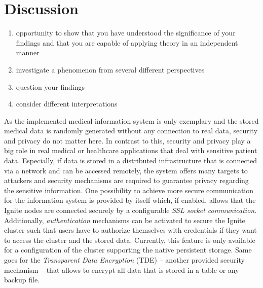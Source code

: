 
\section{Discussion}
\label{sec:disc}

\begin{enumerate}
    \item opportunity to show that you have understood the significance of your findings and that you are capable of applying theory in an independent manner
    \item investigate a phenomenon from several different perspectives
    \item question your findings
    \item consider different interpretations
\end{enumerate}


As the implemented medical information system is only exemplary and the stored medical data is randomly generated without any connection to real data, security and
privacy do not matter here. In contrast to this, security and privacy play a big role in real medical or healthcare applications that deal with sensitive patient
data. Especially, if data is stored in a distributed infrastructure that is connected via a network and can be accessed remotely, the system offers many targets
to attackers and security mechanisms are required to guarantee privacy regarding the sensitive information. One possibility to achieve more secure communication for
the information system is provided by  itself which, if enabled, allows that the Ignite nodes are connected securely by a configurable 
\emph{SSL socket communication}. Additionally, \emph{authentication} mechanisms can be activated to secure the Ignite cluster such that users have to authorize 
themselves with credentials if they want to access the cluster and the stored data. Currently, this feature is only available for a configuration of the cluster
supporting the native persistent storage. Same goes for the \emph{Transparent Data Encryption} (TDE) -- another provided security mechanism -- that allows to 
encrypt all data that is stored in a table or any backup file.

